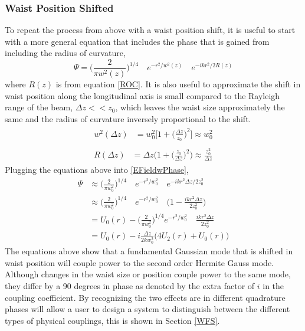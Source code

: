 		\subsubsection{Waist Position Shifted}
		To repeat the process from above with a waist position shift, it is useful to start with a more general equation that includes the phase that is gained from including the radius of curvature,
		\begin{equation}\label{EFieldwPhase}
		\Psi = 	\bigg( \frac{2}{\pi w^2(z)} \bigg)^{1/4} \quad e^{-r^2/w^2(z)} \quad e^{-ikr^2/2R(z)}
		\end{equation}
		where $R(z)$ is from equation \ref{ROC}.  It is also useful to approximate the shift in waist position along the longitudinal axis is small compared to the Rayleigh range of the beam, $\Delta z << z_0$, which leaves the waist size approximately the same and the radius of curvature inversely proportional to the shift. 
		\begin{subequations}
		\begin{align}
		\begin{split}
			w^2(\Delta z)	&= 	w^2_0 \bigg[1 + \bigg(\frac{\Delta z}{z_0}  \bigg)^2 \bigg]  \approx	w^2_0
		\end{split}\\
		\begin{split}
			R(\Delta z) 	&=	\Delta z \bigg(1 + \bigg(\frac{z_0}{\Delta z}\bigg)^2\bigg) \approx	\frac{z_0^2}{\Delta z}
		\end{split}
		\end{align}
		\end{subequations}
	Plugging the equations above into \ref{EFieldwPhase},
		\begin{equation}
		\begin{aligned}
		\Psi 	&\approx	\bigg( \frac{2}{\pi w_0^2} \bigg)^{1/4} \quad e^{-r^2/w_0^2} \quad e^{-ikr^2 \Delta z /2 z_0^2}
		\\		&\approx	\bigg( \frac{2}{\pi w_0^2} \bigg)^{1/4} \quad e^{-r^2/w_0^2} \quad \bigg( 1-\frac{ikr^2 \Delta z}{2 z_0^2}  \bigg)
		\\		&=			U_0(r) - \bigg( \frac{2}{\pi w_0^2} \bigg)^{1/4} e^{-r^2/w_0^2} \quad \frac{ikr^2 \Delta z}{2 z_0^2}
		\\		&=			U_0(r) - i \frac{\Delta z}{2k w_0^2} \bigg( 4U_2(r) + U_0(r) \bigg)
		\end{aligned}
		\end{equation}
		The equations above show that a fundamental Gaussian mode that is shifted in waist position will couple power to the second order Hermite Gauss mode.  Although changes in the waist size or position couple power to the same mode, they differ by a 90 degrees in phase as denoted by the extra factor of $i$ in the coupling coefficient.  By recognizing the two effects are in different quadrature phases will allow a user to design a system to distinguish between the different types of physical couplings, this is shown in Section \ref{WFS}.
		
